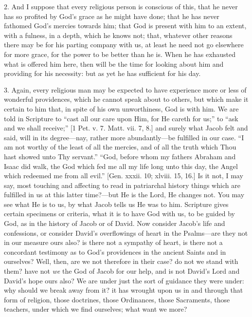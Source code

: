2. And I suppose that every religious person is conscious of this,
that he never has so profited by God's grace as he might have done;
that he has never fathomed God's mercies towards him; that God is
present with him to an extent, with a fulness, in a depth, which he
knows not; that, whatever other reasons there may be for his parting
company with us, at least he need not go elsewhere for more grace, for
the power to be better than he is. When he has exhausted what is
offered him here, then will be the time for looking about him and
providing for his necessity: but as yet he has sufficient for his day.

3. Again, every religious man may be expected to have experience
more or less of wonderful providences, which he cannot speak about to
others, but which make it certain to him that, in spite of his own
unworthiness, God is with him. We are told in Scripture to ``cast
all our care upon Him, for He careth for us;'' to ``ask and we
shall receive;'' [1 Pet. v. 7. Matt. vii. 7, 8.] and surely what
Jacob felt and said, will in its degree—nay, rather more abundantly—be
fulfilled in our case. ``I am not worthy of the least of all the
mercies, and of all the truth which Thou hast showed unto Thy
servant.'' ``God, before whom my fathers Abraham and Isaac did
walk, the God which fed me all my life long unto this day, the Angel
which redeemed me from all evil.'' [Gen. xxxii. 10; xlviii. 15,
16.] Is it not, I may say, most touching and affecting to read in
patriarchal history things which are fulfilled in us at this latter
time?—but He is the Lord, He changes not. You may see what He is to
us, by what Jacob tells us He was to him. Scripture gives certain
specimens or criteria, what it is to have God with us, to be guided by
God, as in the history of Jacob or of David. Now consider Jacob's life
and confessions, or consider David's overflowings of heart in the
Psalms—are they not in our measure ours also? is there not a
sympathy of heart, is there not a concordant testimony as to God's
providences in the ancient Saints and in ourselves? Well, then, are we
not therefore in their case? do not we stand with them? have not \emph{we}
the God of Jacob for our help, and is not David's Lord and David's
hope ours also? We are under just the sort of guidance they were
under: why should we break away from it? it has wrought upon us in and
through that form of religion, those doctrines, those Ordinances,
those Sacraments, those teachers, under which we find ourselves; what
want we more?

